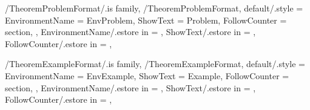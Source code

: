 \newcommand{\InsertCondition}[2][\empty]
{%
  \InsertTheoremContent[#1]{\GetTheoremConditionFormatEnvironmentName}{#2}%
} %

\newcommand{\InitTheoremConditionFormat}
{%
  \ifthenelse{\equal{\GetTheoremConditionFormatFollowCounter}{\empty}}%
  {%
    \newtheorem{%
      \GetTheoremConditionFormatEnvironmentName}{%
      \GetTheoremConditionFormatShowText}%
  }%
  {%
    \newtheorem{%
      \GetTheoremConditionFormatEnvironmentName}{%
      \GetTheoremConditionFormatShowText}[%
      \GetTheoremConditionFormatFollowCounter]%
  }%
} %


\pgfkeys
{
  /TheoremProblemFormat/.is family, /TheoremProblemFormat,
  default/.style =
  {
    EnvironmentName = {EnvProblem},
    ShowText = {Problem},
    FollowCounter = section,
  },
  EnvironmentName/.estore in = \GetTheoremProblemFormatEnvironmentName,
  ShowText/.estore in = \GetTheoremProblemFormatShowText,
  FollowCounter/.estore in = \GetTheoremProblemFormatFollowCounter,
} %

\newcommand{\InsertProblem}[2][\empty]
{%
  \InsertTheoremContent[#1]{\GetTheoremProblemFormatEnvironmentName}{#2}%
} %

\newcommand{\InitTheoremProblemFormat}
{%
  \ifthenelse{\equal{\GetTheoremProblemFormatFollowCounter}{\empty}}%
  {%
    \newtheorem{%
      \GetTheoremProblemFormatEnvironmentName}{%
      \GetTheoremProblemFormatShowText}%
  }%
  {%
    \newtheorem{%
      \GetTheoremProblemFormatEnvironmentName}{%
      \GetTheoremProblemFormatShowText}[%
      \GetTheoremProblemFormatFollowCounter]%
  }%
} %


\pgfkeys
{
  /TheoremExampleFormat/.is family, /TheoremExampleFormat,
  default/.style =
  {
    EnvironmentName = {EnvExample},
    ShowText = {Example},
    FollowCounter = section,
  },
  EnvironmentName/.estore in = \GetTheoremExampleFormatEnvironmentName,
  ShowText/.estore in = \GetTheoremExampleFormatShowText,
  FollowCounter/.estore in = \GetTheoremExampleFormatFollowCounter,
} %

\newcommand{\InsertExample}[2][\empty]
{%
  \InsertTheoremContent[#1]{\GetTheoremExampleFormatEnvironmentName}{#2}%
} %

\newcommand{\InitTheoremExampleFormat}
{%
  \ifthenelse{\equal{\GetTheoremExampleFormatFollowCounter}{\empty}}%
  {%
    \newtheorem{%
      \GetTheoremExampleFormatEnvironmentName}{%
      \GetTheoremExampleFormatShowText}%
  }%
  {%
    \newtheorem{%
      \GetTheoremExampleFormatEnvironmentName}{%
      \GetTheoremExampleFormatShowText}[%
      \GetTheoremExampleFormatFollowCounter]%
  }%
} %

